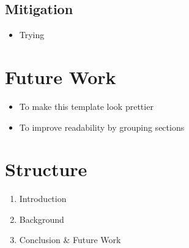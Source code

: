 \documentclass{paper_proposal}
\begin{document}
\subsection{Mitigation}
\begin{itemize}
  \item Trying 
\end{itemize}

\section{Future Work}
\begin{itemize}
  \item To make this template look prettier
  \item To improve readability by grouping sections
\end{itemize}

\section{Structure}

\begin{enumerate}
  \item Introduction
  \item Background
  \item Conclusion \& Future Work
\end{enumerate}
\end{document}
